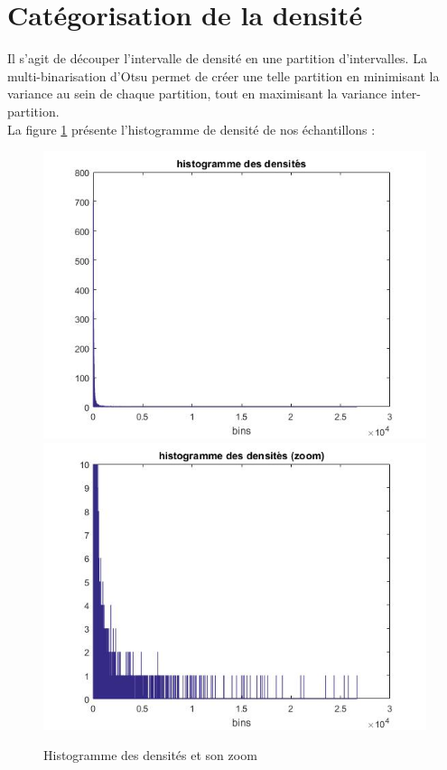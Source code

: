 \documentclass{book}
\begin{document}
\section{Catégorisation de la densité}\label{cat}

Il s'agit de découper l'intervalle de densité en une partition d'intervalles. La multi-binarisation d'Otsu permet de créer une telle partition en
minimisant la variance au sein de chaque partition, tout en maximisant la variance inter-partition.\\
La figure \ref{densite_histo} présente l'histogramme de densité de nos échantillons :

\begin{figure}[H]
\begin{center}
\includegraphics[scale=0.5]{images/densite_histo.jpg}
\includegraphics[scale=0.5]{images/densite_histo_zoom.jpg}
\end{center}
\caption{Histogramme des densités et son zoom}
\label{densite_histo}
\end{figure}
\end{document}
